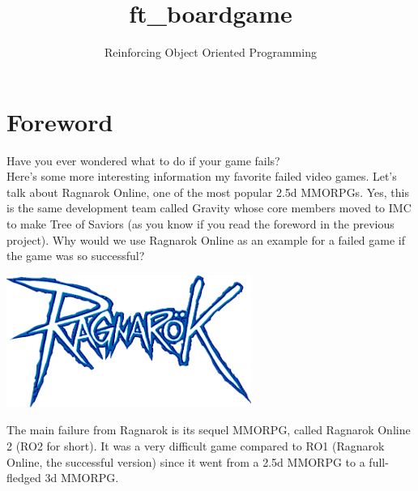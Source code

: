 \documentclass{42-en}
\begin{document}
\title{ft\_boardgame}
\subtitle{Reinforcing Object Oriented Programming}

\maketitle

\tableofcontents


\chapter{Foreword}

	Have you ever wondered what to do if your game fails?\\

	Here's some more interesting information my favorite failed video games.
	Let's talk about Ragnarok Online, one of the most popular 2.5d MMORPGs. Yes,
	this is the same development team called Gravity whose core members moved to
	IMC to make Tree of Saviors	(as you know if you read the foreword in the
	previous project). Why would we use Ragnarok Online as an example for a 
	failed game if the game was so successful?

	\begin{center}
		\includegraphics[width=0.6\textwidth]{images/ragnarok.png}
	\end{center}

	The main failure from Ragnarok is its sequel MMORPG, called Ragnarok Online
	2 (RO2 for short). It was a very difficult game compared to RO1 (Ragnarok
	Online, the successful version) since it went from a 2.5d MMORPG to a full-
	fledged 3d MMORPG.\\
\end{document}
